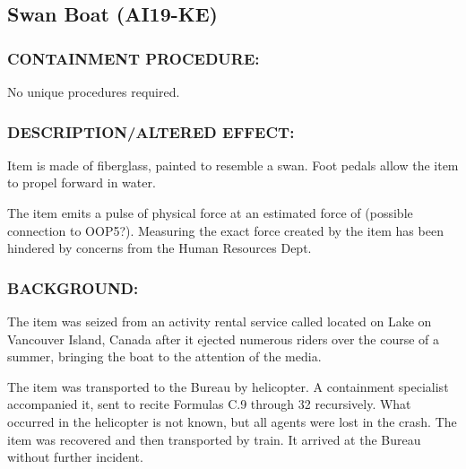 \subsection*{Swan Boat (AI19-KE)}
\subsubsection*{CONTAINMENT PROCEDURE:}
\par No unique procedures required.
\subsubsection*{DESCRIPTION/ALTERED EFFECT:}
\par Item is made of fiberglass, painted to
resemble a swan. Foot pedals allow the
item to propel forward in water.
\par The item emits a pulse of physical force
at an estimated force of 
(possible connection to OOP5?). Measuring the exact force created by the
item has been hindered by concerns from the Human Resources
Dept.
\subsubsection*{BACKGROUND:}
\par The item was seized from an activity rental service called 
located on Lake  on Vancouver Island, Canada after it ejected numerous riders over
the course of a summer, bringing the boat to the attention of the
media.
\par The item was transported to the Bureau by helicopter. A
containment specialist accompanied it, sent to recite Formulas
C.9 through 32 recursively. What occurred in the helicopter is not
known, but all agents were lost in the crash. The item was
recovered and then transported by train. It arrived at the Bureau
without further incident.